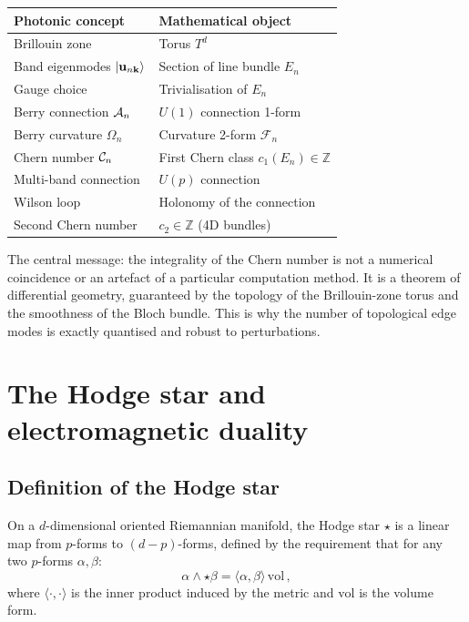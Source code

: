 \begin{center}
\begin{tabular}{ll}
  \toprule
  \textbf{Photonic concept} & \textbf{Mathematical object} \\
  \midrule
  Brillouin zone & Torus $T^d$ \\
  Band eigenmodes $|\mathbf{u}_{n\mathbf{k}}\rangle$ &
    Section of line bundle $E_n$ \\
  Gauge choice & Trivialisation of $E_n$ \\
  Berry connection $\mathcal{A}_n$ & $U(1)$ connection 1-form \\
  Berry curvature $\Omega_n$ & Curvature 2-form $\mathcal{F}_n$ \\
  Chern number $\mathcal{C}_n$ &
    First Chern class $c_1(E_n)\in\mathbb{Z}$ \\
  Multi-band connection & $U(p)$ connection \\
  Wilson loop & Holonomy of the connection \\
  Second Chern number &
    $c_2\in\mathbb{Z}$ (4D bundles) \\
  \bottomrule
\end{tabular}
\end{center}

The central message: the integrality of the Chern number is not a
numerical coincidence or an artefact of a particular computation
method.  It is a theorem of differential geometry, guaranteed by the
topology of the Brillouin-zone torus and the smoothness of the Bloch
bundle.  This is why the number of topological edge modes is exactly
quantised and robust to perturbations.

\section{The Hodge star and electromagnetic duality}
\label{sec:appB-hodge}

\subsection{Definition of the Hodge star}
\label{sec:appB-hodge-def}

On a $d$-dimensional oriented Riemannian manifold, the Hodge star
$\star$ is a linear map from $p$-forms to $(d-p)$-forms, defined by
the requirement that for any two $p$-forms $\alpha,\beta$:
\begin{equation}\label{eq:appB-hodge-def}
  \alpha\wedge\star\beta = \langle\alpha,\beta\rangle\,
  \mathrm{vol}\,,
\end{equation}
where $\langle\cdot,\cdot\rangle$ is the inner product induced by the
metric and $\mathrm{vol}$ is the volume form.

